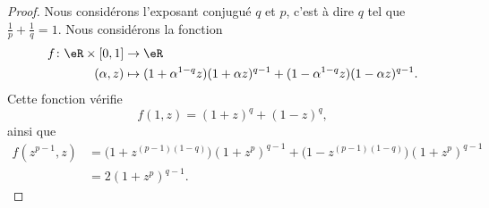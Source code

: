 	\begin{proof}
		Nous considérons l'exposant conjugué \( q\) et \( p\), c'est à dire \( q\) tel que \( \frac{1}{ p }+\frac{1}{ q }=1\). Nous considérons la fonction
		\begin{equation}
			\begin{aligned}
				f\colon \eR\times \mathopen[ 0 , 1 \mathclose] & \to \eR                                                                          \\
				(\alpha,z)                                     & \mapsto (1+\alpha^{1-q}z)(1+\alpha z)^{q-1}+(1-\alpha^{1-q}z)(1-\alpha z)^{q-1}.
			\end{aligned}
		\end{equation}
		Cette fonction vérifie
		\begin{equation}        \label{EQooRFZQooJvdocT}
			f(1,z)=(1+z)^q+(1-z)^q,
		\end{equation}
		ainsi que
		\begin{subequations}        \label{EQooISBRooHMiPRE}
			\begin{align}
				f(z^{p-1},z) & =\big( 1+z^{(p-1)(1-q)} \big)(1+z^p)^{q-1}+\big( 1-z^{(p-1)(1-q)} \big)(1+z^p)^{q-1} \\
				             & =2(1+z^p)^{q-1}.
			\end{align}
		\end{subequations}


\end{proof}
